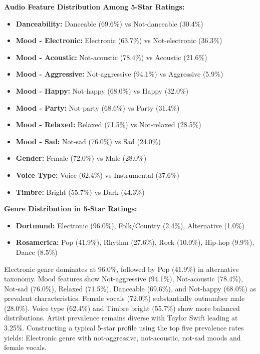 \documentclass[12pt,a4paper]{article}
\begin{document}
\textbf{Audio Feature Distribution Among 5-Star Ratings:}
\begin{itemize}
    \item \textbf{Danceability:} Danceable (69.6\%) vs Not-danceable (30.4\%)
    \item \textbf{Mood - Electronic:} Electronic (63.7\%) vs Not-electronic (36.3\%)
    \item \textbf{Mood - Acoustic:} Not-acoustic (78.4\%) vs Acoustic (21.6\%)
    \item \textbf{Mood - Aggressive:} Not-aggressive (94.1\%) vs Aggressive (5.9\%)
    \item \textbf{Mood - Happy:} Not-happy (68.0\%) vs Happy (32.0\%)
    \item \textbf{Mood - Party:} Not-party (68.6\%) vs Party (31.4\%)
    \item \textbf{Mood - Relaxed:} Relaxed (71.5\%) vs Not-relaxed (28.5\%)
    \item \textbf{Mood - Sad:} Not-sad (76.0\%) vs Sad (24.0\%)
    \item \textbf{Gender:} Female (72.0\%) vs Male (28.0\%)
    \item \textbf{Voice Type:} Voice (62.4\%) vs Instrumental (37.6\%)
    \item \textbf{Timbre:} Bright (55.7\%) vs Dark (44.3\%)
\end{itemize}

\textbf{Genre Distribution in 5-Star Ratings:}
\begin{itemize}
    \item \textbf{Dortmund:} Electronic (96.0\%), Folk/Country (2.4\%), Alternative (1.0\%)
    \item \textbf{Rosamerica:} Pop (41.9\%), Rhythm (27.6\%), Rock (10.0\%), Hip-hop (9.9\%), Dance (8.5\%)
\end{itemize}

Electronic genre dominates at 96.0\%, followed by Pop (41.9\%) in alternative taxonomy. Mood features show Not-aggressive (94.1\%), Not-acoustic (78.4\%), Not-sad (76.0\%), Relaxed (71.5\%), Danceable (69.6\%), and Not-happy (68.0\%) as prevalent characteristics. Female vocals (72.0\%) substantially outnumber male (28.0\%). Voice type (62.4\%) and Timbre bright (55.7\%) show more balanced distributions. Artist prevalence remains diverse with Taylor Swift leading at 3.25\%. Constructing a typical 5-star profile using the top five prevalence rates yields: Electronic genre with not-aggressive, not-acoustic, not-sad moods and female vocals.
\end{document}
